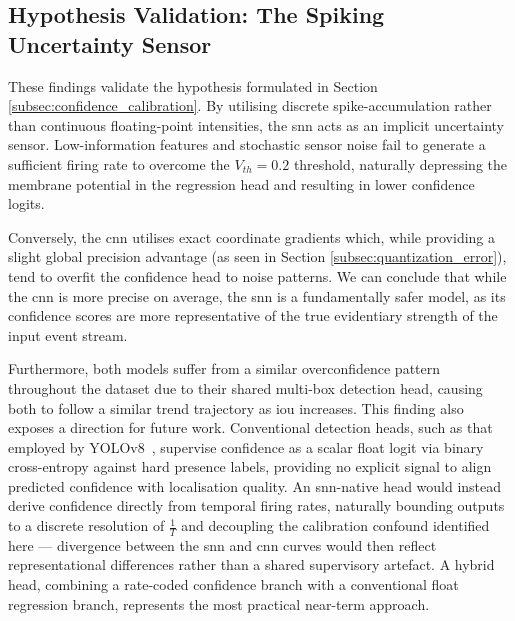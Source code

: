 \subsection*{Hypothesis Validation: The Spiking Uncertainty Sensor}

These findings validate the hypothesis formulated in Section \ref{subsec:confidence_calibration}. By utilising discrete spike-accumulation rather than continuous floating-point intensities, the \gls{snn} acts as an implicit uncertainty sensor. Low-information features and stochastic sensor noise fail to generate a sufficient firing rate to overcome the $V_{th}=0.2$ threshold, naturally depressing the membrane potential in the regression head and resulting in lower confidence logits. 

Conversely, the \gls{cnn} utilises exact coordinate gradients which, while providing a slight global precision advantage (as seen in Section \ref{subsec:quantization_error}), tend to overfit the confidence head to noise patterns. We can conclude that while the \gls{cnn} is more precise on average, the \gls{snn} is a fundamentally safer model, as its confidence scores are more representative of the true evidentiary strength of the input event stream.

Furthermore, both models suffer from a similar overconfidence pattern throughout the dataset due to their shared multi-box detection head, causing both to follow a similar trend trajectory as \gls{iou} increases.
This finding also exposes a direction for future work. 
Conventional detection heads, such as that employed by YOLOv8~\cite{yolov8_ultralytics}, supervise confidence as a 
scalar float logit via binary cross-entropy against hard presence labels, providing no explicit signal to align predicted confidence with localisation quality. 
An \gls{snn}-native head would instead derive confidence directly from temporal firing 
rates, naturally bounding outputs to a discrete resolution of $\frac{1}{T}$ and 
decoupling the calibration confound identified here --- divergence between the 
\gls{snn} and \gls{cnn} curves would then reflect representational differences rather 
than a shared supervisory artefact. 
A hybrid head, combining a rate-coded confidence branch with a conventional float
regression branch, represents the most practical near-term approach.